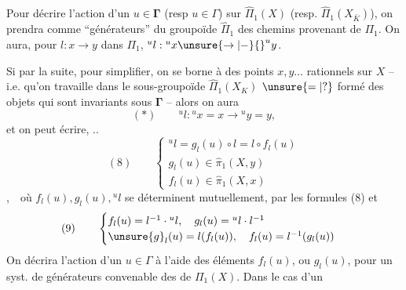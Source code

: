 Pour décrire l'action d'un $u\in\mathbf{\Gamma}$ (resp $u\in\Gamma$) sur $\widehat\Pi_1(X)$ (resp.  $\widehat\Pi_1(X_{\bar K})$), on prendra comme ``générateurs'' du groupoïde $\widehat\Pi_1$ des chemins provenant de $\Pi_1$. On aura, pour ${l}:x\to y$ dans $\Pi_1$, ${}^u{l}:{}^ux\unsure{\to|-}{}^uy$.

Si  par la suite, pour simplifier, on se borne à des points $x,y\ldots$ rationnels sur $X$ -- i.e. qu'on travaille dans le sous-groupoïde $\widehat\Pi_1(X_K)$ $\unsure{=|?}$ formé des objets qui sont invariants sous $\mathbf{\Gamma}$ -- alors on aura
\[
(*)\qquad{}^u{l}:{}^ux=x\longrightarrow{}^uy=y,
\]
et on peut écrire, ..
\[
(8)\qquad\begin{cases}
{}^u{l}=g_{l}(u)\circ{l}={l}\circ f_{l}(u)\\
g_{l}(u)\in\widehat\pi_1(X,y)\\
f_{l}(u)\in\widehat\pi_1(X,x)
\end{cases}
\]
,\,\,\,\,
où $f_{l}(u),g_{l}(u),{}^u{l}$ se déterminent mutuellement,  par les formules (8) et
\[
(9)\qquad\begin{cases}
f_{l}(u)={l}^{-1}\cdot{}^u{l},\quad g_{l}(u)={}^u{l}\cdot{l}^{-1}\\
\unsure{g}_{l}(u)={l}(f_{l}(u)),\quad f_{l}(u)={l}^{-1}(g_{l}(u))
\end{cases}
\]
On décrira l'action d'un $u\in\Gamma$  à l'aide des éléments $f_{l}(u)$, ou $g_{l}(u)$, pour un syst. de générateurs convenable des   de $\Pi_1(X)$. Dans le cas d'un
